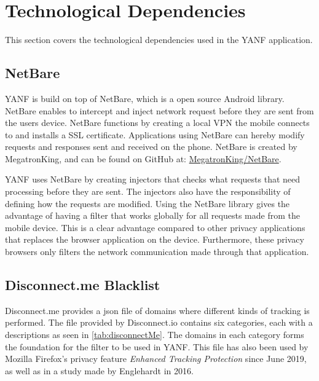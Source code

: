 \documentclass[main.tex]{subfiles}
\begin{document}
\section{Technological Dependencies}
\label{sec:technologies}
This section covers the technological dependencies used in the YANF application.


\subsection{NetBare}
YANF is build on top of NetBare, which is a open source Android library\cite{MagatronKingMegatronKing/NetBare:Android}. NetBare enables to intercept and inject network  request before they are sent from the users device. NetBare functions by creating a local VPN the mobile connects to and installs a SSL certificate. Applications using NetBare can hereby modify requests and responses sent and received on the phone. NetBare is created by MegatronKing, and can be found on GitHub at: \hyperlink{https://github.com/MegatronKing/NetBare}{MegatronKing/NetBare}.

YANF uses NetBare by creating injectors that checks what requests that need processing before they are sent. The injectors also have the responsibility of defining how the requests are modified. Using the NetBare library gives the advantage of having a filter that works globally for all requests made from the mobile device. This is a clear advantage compared to other privacy applications that replaces the browser application on the device. Furthermore, these privacy browsers only filters the network communication made through that application.




\subsection{Disconnect.me Blacklist}
\label{sec:disconnect-me}
Disconnect.me provides a json file of domains where different kinds of tracking is performed. The file provided by Disconnect.io contains six categories, each with a descriptions as seen in \autoref{tab:disconnectMe}.
The domains in each category forms the foundation for the filter to be used in YANF. This file has also been used by Mozilla Firefox's privacy feature \textit{Enhanced Tracking Protection} since June 2019, as well as in a study made by Englehardt in 2016\cite{Englehardt2016OnlineAnalysis}.
\end{document}

